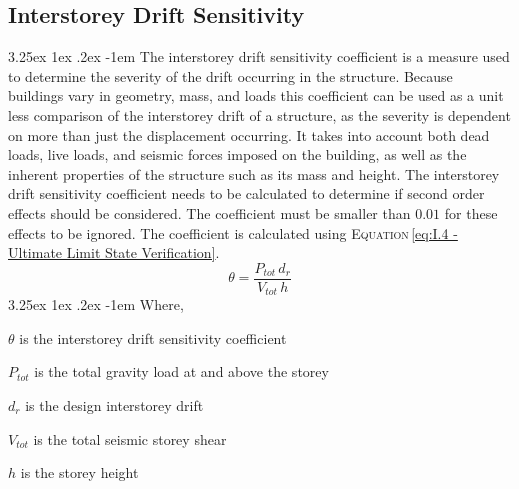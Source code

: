 \documentclass[11pt,a4paper,titlepage]{report}
\makeatletter
\renewcommand\paragraph{\@startsection{paragraph}{5}{\z@}%
  {3.25ex \@plus1ex \@minus.2ex}%
  {-1em}%
  {\normalfont\normalsize\bfseries}}
\makeatother
\begin{document}
\subsection{Interstorey Drift Sensitivity}
\paragraph{} The interstorey drift sensitivity coefficient is a measure used to determine the severity of the drift occurring in the structure. Because buildings vary in geometry, mass, and loads this coefficient can be used as a unit less comparison of the interstorey drift of a structure, as the severity is dependent on more than just the displacement occurring. It takes into account both dead loads, live loads, and seismic forces imposed on the building, as well as the inherent properties of the structure such as its mass and height. The interstorey drift sensitivity coefficient needs to be calculated to determine if second order effects should be considered. The coefficient must be smaller than $0.01$ for these effects to be ignored. The coefficient is calculated using \textsc{Equation}\,\eqref{eq:I.4 - Ultimate Limit State Verification}.
\begin{equation}
    \theta=\dfrac{P_{tot}\,d_r}{V_{tot}\,h}
    \label{eq:I.4 - Ultimate Limit State Verification}
\end{equation}
\paragraph{}Where,
\begin{itemize}
\begin{small}
    \item $\theta$ is the interstorey drift sensitivity coefficient
    \item $P_{tot}$ is the total gravity load at and above the storey
    \item $d_r$ is the design interstorey drift
    \item $V_{tot}$ is the total seismic storey shear
    \item $h$ is the storey height
\end{small}
\end{itemize}
\end{document}
